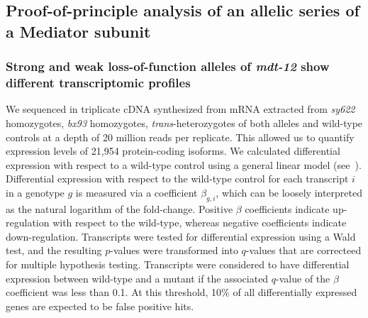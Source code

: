 \documentclass[10pt, twocolumn]{article}
\newcommand{\gene}[1]{\mbox{\emph{#1}}}
\begin{document}

\subsection*{Proof-of-principle analysis of an allelic series of a Mediator subunit}
\subsubsection*{Strong and weak loss-of-function alleles of \gene{mdt-12} show
             different transcriptomic profiles}
We sequenced in triplicate cDNA synthesized from mRNA extracted from
\emph{sy622} homozygotes, \emph{bx93} homozygotes,
\emph{trans}-heterozygotes of both alleles and wild-type controls at a depth of
20 million reads per replicate. This allowed us to quantify expression levels of
21,954 protein-coding isoforms. We calculated differential expression with
respect to a wild-type control using a general linear model
(see~). Differential expression with respect to the
wild-type control for each transcript $i$ in a genotype $g$ is measured via a
coefficient $\beta_{g, i}$, which can be loosely interpreted as the natural
logarithm of the fold-change. Positive $\beta$ coefficients indicate
up-regulation with respect to the wild-type, whereas negative coefficients
indicate down-regulation. Transcripts were tested for differential expression
using a Wald test, and the resulting $p$-values were transformed into $q$-values
that are correcteed for multiple hypothesis testing. Transcripts were considered
to have differential expression between wild-type and a mutant if the associated
$q$-value of the $\beta$ coefficient was less than 0.1. At this threshold, 10\%
of all differentially expressed genes are expected to be false positive hits.
\end{document}
